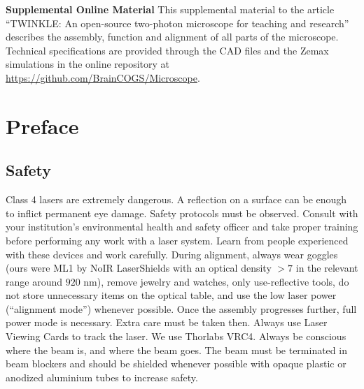 \documentclass[10pt,letterpaper]{article}
\begin{document}
\vspace*{0.2in}

{
\centering\Large\textbf{Supplemental Online Material} 
}
\newline\newline
This supplemental material to the article ``TWINKLE: An open-source two-photon microscope for teaching and research'' describes the assembly, function and alignment of all parts of the microscope. Technical specifications are provided through the CAD files and the Zemax simulations in the online repository at \url{https://github.com/BrainCOGS/Microscope}.

\tableofcontents
\newpage

\linenumbers

\section{Preface}

\subsection{Safety}
Class 4 lasers are extremely dangerous. A reflection on a surface can be enough to inflict permanent eye damage. Safety protocols must be observed. Consult with your institution's environmental health and safety officer and take proper training before performing any work with a laser system. Learn from people experienced with these devices and work carefully.\newline
During alignment, always wear goggles (ours were ML1 by NoIR LaserShields with an optical density $>7$ in the relevant range around $920\text{ nm}$), remove jewelry and watches, only use-reflective tools, do not store unnecessary items on the optical table, and use the low laser power (“alignment mode”) whenever possible. Once the assembly progresses further, full power mode is necessary. Extra care must be taken then. Always use Laser Viewing Cards to track the laser. We use Thorlabs VRC4. Always be conscious where the beam is, and where the beam goes. The beam must be terminated in beam blockers and should be shielded whenever possible with opaque plastic or anodized aluminium tubes to increase safety.
\end{document}
